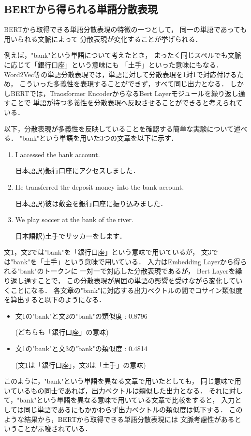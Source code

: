 	\subsection{BERTから得られる単語分散表現}
		BERTから取得できる単語分散表現の特徴の一つとして，
		同一の単語であっても用いられる文脈によって
		分散表現が変化することが挙げられる．

		例えば，"bank"という単語について考えたとき，
		まったく同じスペルでも文脈に応じて「銀行口座」という意味にも
		「土手」といった意味にもなる．
		Word2Vec等の単語分散表現では，単語に対して分散表現を1対1で対応付けるため，
		こういった多義性を表現することができず，すべて同じ出力となる．
		しかしBERTでは，Traosformer EncoderからなるBert Layerモジュールを繰り返し通すことで
		単語が持つ多義性を分散表現へ反映させることができると考えられている．

		以下，分散表現が多義性を反映していることを確認する簡単な実験\cite{pytorch_advanced}について述べる．
		"bank"という単語を用いた3つの文章を以下に示す．
		\begin{enumerate}
			\item I accessed the bank account.
			\par 日本語訳)銀行口座にアクセスしました．
			\item He transferred the deposit money into the bank account.
			\par 日本語訳)彼は敷金を銀行口座に振り込みました．
			\item We play soccer at the bank of the river.
			\par 日本語訳)土手でサッカーをします．
		\end{enumerate}
		
		文1，文2では"bank"を「銀行口座」という意味で用いているが，
		文3では"bank"を「土手」という意味で用いている．
		入力はEmbedding Layerから得られる"bank"のトークンに
		一対一で対応した分散表現であるが，
		Bert Layerを繰り返し通すことで，
		この分散表現が周囲の単語の影響を受けながら変化していくことになる．
		各文章の"bank"に対応する出力ベクトルの間でコサイン類似度を算出すると以下のようになる．
		\begin{itemize}
			\item 文1の"bank"と文2の"bank"の類似度 : 0.8796
			\par (どちらも「銀行口座」の意味)
			\item 文1の"bank"と文3の"bank"の類似度 : 0.4814
			\par (文1は「銀行口座」，文3は「土手」の意味)
		\end{itemize}
		
		このように，"bank"という単語を異なる文章で用いたとしても，
		同じ意味で用いているもの同士であれば，出力ベクトルは類似した出力となる．
		それに対して，"bank"という単語を異なる意味で用いている文章で比較をすると，
		入力としては同じ単語であるにもかかわらず出力ベクトルの類似度は低下する．
		このような結果から，BERTから取得できる単語分散表現には
		文脈考慮性があるということが示唆されている．




